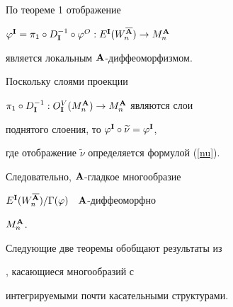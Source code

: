  





\begin{pf}


По теореме 1 отображение


$\varphi^\I=\pi_1\circ D^{-1}_\I\circ\varphi^O:


E^\I(W_n^{\overline\A})\to M^\A_n$


является локальным ${\bold A}$-диффеоморфизмом.


Поскольку слоями проекции


$\pi_1\circ D_{\bold I}^{-1}:O^V_{\bold I}(M^{\bold A}_n)\to M^{\bold A}_n$ являются слои


поднятого слоения, то $\varphi^{\bold I}\circ\widetilde\nu=\varphi^{\bold I}$,


где отображение $\widetilde\nu$ определяется формулой (\ref{nu}).


Следовательно, ${\bold A}$-гладкое многообразие


$E^{\bold I}(W^{\overline{{\bold A}}}_n)/\Gamma(\varphi)$ \ ${\bold A}$-диффеоморфно


$M^{{\bold A}}_n$.


\end{pf}





 


Следующие две теоремы обобщают результаты из


\cite{Cr-T}, касающиеся многообразий с


интегрируемыми почти касательными структурами.








